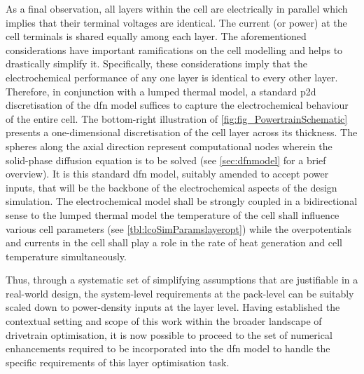 As a final observation, all layers  within the cell are electrically in parallel
which implies that their terminal voltages are identical. The current (or power)
at the  cell terminals is  shared equally  among each layer.  The aforementioned
considerations have important  ramifications on the cell modelling  and helps to
drastically  simplify  it. Specifically,  these  considerations  imply that  the
electrochemical  performance  of any  one  layer  is  identical to  every  other
layer.  Therefore,  in conjunction  with  a  lumped  thermal model,  a  standard
\gls{p2d}  discretisation  of  the  \gls{dfn}  model  suffices  to  capture  the
electrochemical behaviour of  the entire cell. The  bottom-right illustration of
\cref{fig:fig_PowertrainSchematic} presents a  one-dimensional discretisation of
the  cell layer  across its  thickness. The  spheres along  the axial  direction
represent computational nodes  wherein the solid-phase diffusion  equation is to
be solved  (see \cref{sec:dfnmodel} for a  brief overview). It is  this standard
\gls{dfn}  model,  suitably  amended  to  accept  power  inputs,  that  will  be
the  backbone of  the  electrochemical  aspects of  the  design simulation.  The
electrochemical model shall be strongly coupled  in a bidirectional sense to the
lumped thermal model  \ie{} the temperature of the cell  shall influence various
cell parameters  (see \cref{tbl:lcoSimParamslayeropt}) while  the overpotentials
and currents in  the cell shall play a  role in the rate of  heat generation and
cell temperature simultaneously.

Thus, through a  systematic set of simplifying assumptions  that are justifiable
in a real-world  design, the system-level requirements at the  pack-level can be
suitably  scaled  down  to  power-density  inputs at  the  layer  level.  Having
established the  contextual setting and  scope of  this work within  the broader
landscape of drivetrain  optimisation, it is now possible to  proceed to the set
of numerical enhancements  required to be incorporated into  the \gls{dfn} model
to handle the specific requirements of this layer optimisation task.

